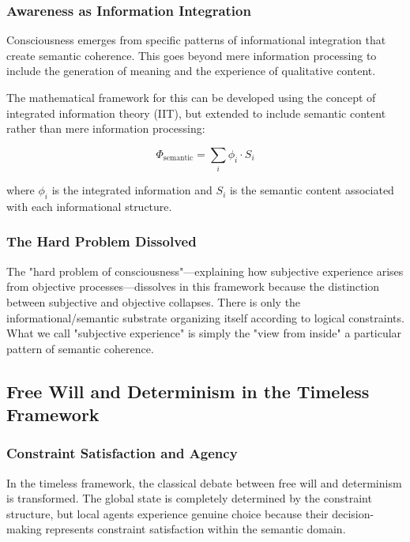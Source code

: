 \documentclass[12pt,a4paper]{article}
\begin{document}
\subsubsection{Awareness as Information Integration}

Consciousness emerges from specific patterns of informational integration that create semantic coherence. This goes beyond mere information processing to include the generation of meaning and the experience of qualitative content.

The mathematical framework for this can be developed using the concept of integrated information theory (IIT), but extended to include semantic content rather than mere information processing:

\begin{equation}
    \Phi_{\text{semantic}} = \sum_{i} \phi_i \cdot S_i
\end{equation}

where $\phi_i$ is the integrated information and $S_i$ is the semantic content associated with each informational structure.

\subsubsection{The Hard Problem Dissolved}

The "hard problem of consciousness"—explaining how subjective experience arises from objective processes—dissolves in this framework because the distinction between subjective and objective collapses. There is only the informational/semantic substrate organizing itself according to logical constraints. What we call "subjective experience" is simply the "view from inside" a particular pattern of semantic coherence.

\subsection{Free Will and Determinism in the Timeless Framework}

\subsubsection{Constraint Satisfaction and Agency}

In the timeless framework, the classical debate between free will and determinism is transformed. The global state is completely determined by the constraint structure, but local agents experience genuine choice because their decision-making represents constraint satisfaction within the semantic domain.
\end{document}
